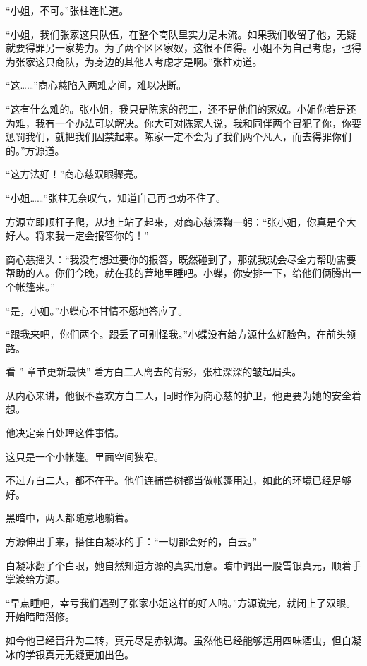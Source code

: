 
\begin{this_body}

“小姐，不可。”张柱连忙道。

“小姐，我们张家这只队伍，在整个商队里实力是末流。如果我们收留了他，无疑就要得罪另一家势力。为了两个区区家奴，这很不值得。小姐不为自己考虑，也得为张家这只商队，为身边的其他人考虑才是啊。”张柱劝道。

“这……”商心慈陷入两难之间，难以决断。

“这有什么难的。张小姐，我只是陈家的帮工，还不是他们的家奴。小姐你若是还为难，我有一个办法可以解决。你大可对陈家人说，我和同伴两个冒犯了你，你要惩罚我们，就把我们囚禁起来。陈家一定不会为了我们两个凡人，而去得罪你们的。”方源道。

“这方法好！”商心慈双眼骤亮。

“小姐……”张柱无奈叹气，知道自己再也劝不住了。

方源立即顺杆子爬，从地上站了起来，对商心慈深鞠一躬：“张小姐，你真是个大好人。将来我一定会报答你的！”

商心慈摇头：“我没有想过要你的报答，既然碰到了，那就我就会尽全力帮助需要帮助的人。你们今晚，就在我的营地里睡吧。小蝶，你安排一下，给他们俩腾出一个帐篷来。”

“是，小姐。”小蝶心不甘情不愿地答应了。

“跟我来吧，你们两个。跟丢了可别怪我。”小蝶没有给方源什么好脸色，在前头领路。

看 ” 章节更新最快” 着方白二人离去的背影，张柱深深的皱起眉头。

从内心来讲，他很不喜欢方白二人，同时作为商心慈的护卫，他更要为她的安全着想。

他决定亲自处理这件事情。

这只是一个小帐篷。里面空间狭窄。

不过方白二人，都不在乎。他们连捕兽树都当做帐篷用过，如此的环境已经足够好。

黑暗中，两人都随意地躺着。

方源伸出手来，搭住白凝冰的手：“一切都会好的，白云。”

白凝冰翻了个白眼，她自然知道方源的真实用意。暗中调出一股雪银真元，顺着手掌渡给方源。

“早点睡吧，幸亏我们遇到了张家小姐这样的好人呐。”方源说完，就闭上了双眼。开始暗暗潜修。

如今他已经晋升为二转，真元尽是赤铁海。虽然他已经能够运用四味酒虫，但白凝冰的学银真元无疑更加出色。


\end{this_body}
